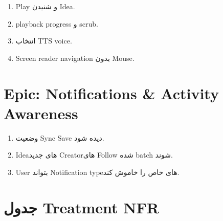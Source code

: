 \begin{enumerate}
  \item Play و شنیدن Idea. \eng{[NFR-08]}
  \item playback progress و scrub. \eng{[NFR-16]}
  \item انتخاب TTS voice. \eng{[NFR-16]}
  \item Screen reader navigation بدون Mouse. \eng{[NFR-16]}
\end{enumerate}

\section{Epic: Notifications \& Activity Awareness}

\begin{enumerate}
  \item وضعیت Sync Save دیده شود. \eng{[NFR-05]}
  \item Ideaهای جدید Creatorهای Follow شده batch شوند. \eng{[NFR-06]}
  \item User بتواند Notification typeهای خاص را خاموش کند. \eng{[NFR-06]}
\end{enumerate}

\section{جدول Treatment NFR}

